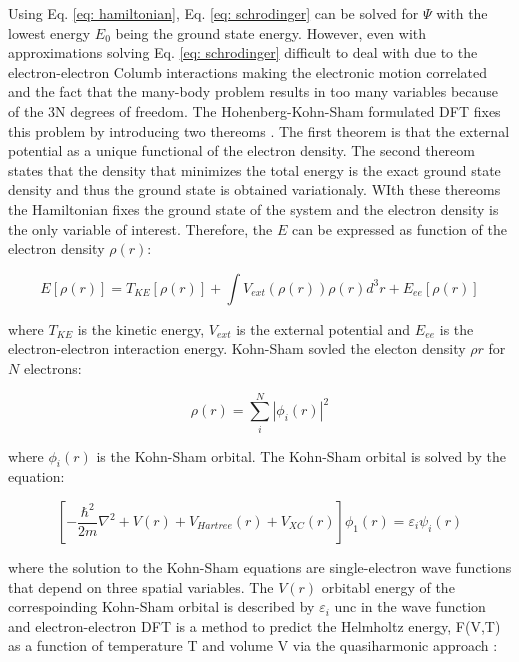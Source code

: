 Using Eq. \ref{eq: hamiltonian}, Eq. \ref{eq: schrodinger} can be solved for $\Psi$ with the lowest energy $E_0$ being the ground state energy. However, even with approximations solving Eq. \ref{eq: schrodinger} difficult to deal with due to the electron-electron Columb interactions making the electronic motion correlated and the fact that the many-body problem results in too many variables because of the 3N degrees of freedom. The Hohenberg-Kohn-Sham formulated DFT fixes this problem by introducing two thereoms \cite{Hohenberg1964,Kohn1965}. The first theorem is that the external potential as a unique functional of the electron density. The second thereom states that the density that minimizes the total energy is the exact ground state density and thus the ground state is obtained variationaly. WIth these thereoms the Hamiltonian fixes the ground state of the system and the electron density is the only variable of interest. Therefore, the $E$ can be expressed as function of the electron density $\rho(r)$:

\begin{equation}
\label{eq: hkenergy}
E [\rho(r)] = T_{KE}[\rho(r)] + \int V_{ext} (\rho(r))\rho(r) d^3 r + E_{ee} [\rho(r)]
\end{equation}

 where $T_{KE}$ is the kinetic energy, $V_{ext}$ is the external potential and $E_{ee}$ is the electron-electron interaction energy. Kohn-Sham sovled the electon density $\rho{r}$ for $N$ electrons:
 
 \begin{equation}
 \label{eq: electrondensity}
 \rho(r) = \sum_{i}^{N} |\phi_{i}(r)|^{2} 
 \end{equation}
 
 where $\phi_{i}(r)$ is the Kohn-Sham orbital. The Kohn-Sham orbital is solved by the equation:
 
  \begin{equation}
 \label{eq: kohnsham}
[-\frac{\hbar^2}{2m} \nabla^{2} + V (r) + V_{Hartree}(r) + V_{XC} (r)] \phi_{1}(r) = \varepsilon_{i} \psi_{i}(r)
 \end{equation}
 
where the solution to the Kohn-Sham equations are single-electron wave functions that depend on three spatial variables. The $V (r)$ orbitabl energy of the correspoinding Kohn-Sham orbital is described by $\varepsilon_{i}$ unc  in the wave function and electron-electron 
DFT is a method to predict the Helmholtz energy, F(V,T) as a function of temperature T and volume V via the quasiharmonic approach \cite{Shang2010,Wang2004}:

